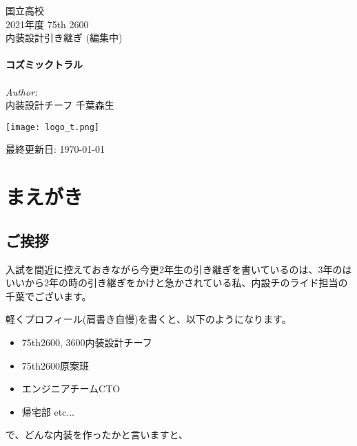 \documentclass[uplatex,dvipdfmx]{jsreport}
\begin{document}
\begin{titlepage}

    \newcommand{\HRule}{\rule{\linewidth}{0.5mm}}
    
    \center
    
    \LARGE 国立高校\\
    \Large 2021年度 75th 2600\\
    \large 内装設計引き継ぎ (編集中)\\[0.5cm]
    
    \hrulefill\\[0.4cm]
    { \huge \bfseries コズミックトラル}\\[0.2cm]
    \hrulefill\\[1cm]
    
    \Large \emph{Author:}\\
    内装設計チーフ 千葉森生

    \vfill
    
    \texttt{[image: logo\_t.png]}

    \vfill
    
    {最終更新日: \large \today}

    \vfill
    
\end{titlepage}

\tableofcontents

\chapter{まえがき}
\section{ご挨拶}
入試を間近に控えておきながら今更2年生の引き継ぎを書いているのは、3年のはいいから2年の時の引き継ぎをかけと急かされている私、内設チのライド担当の千葉でございます。

軽くプロフィール(肩書き自慢)を書くと、以下のようになります。
\begin{itemize}
    \item 75th2600, 3600内装設計チーフ
    \item 75th2600原案班
    \item エンジニアチームCTO
    \item 帰宅部 etc...
\end{itemize}

で、どんな内装を作ったかと言いますと、
\end{document}

